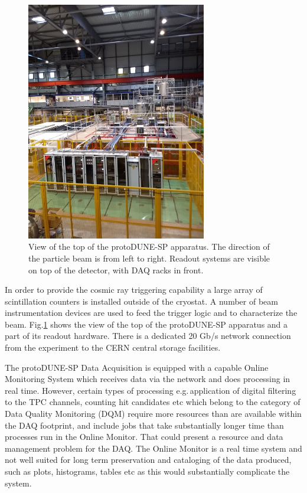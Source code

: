 \documentclass{webofc}
\newcommand{\pd}{protoDUNE\xspace}
\begin{document}
\begin{figure}[tb]
\centering\includegraphics[width=0.7\textwidth]{figures/np04_photo_2018_v1.png}
\caption{\label{fig:np04_photo}
View of the top of the \pd-SP apparatus.
The direction of the particle beam is from left to right.
Readout systems are visible on top of the detector, with DAQ racks in front.
}
\end{figure}


In order to provide the cosmic ray triggering capability a large array of scintillation
counters is installed outside of the cryostat. A number of beam instrumentation devices
are used to feed the  trigger logic and to characterize the beam. Fig.\ref{fig:np04_photo}
shows the view of the top of the \pd-SP apparatus and a part of its readout hardware.
There is a dedicated 20 Gb/s network connection from the experiment to the CERN central storage facilities.

The \pd-SP Data Acquisition is equipped with a capable Online Monitoring System which receives data via
the network and does processing in real time. However, certain types of processing e.g.\,application of
digital filtering to the TPC channels, counting hit candidates etc which belong to the
category of Data Quality Monitoring (DQM) require more resources than are available within
the DAQ footprint, and include jobs that take substantially longer time than processes run in the
Online Monitor. That could present a resource and data management problem for the DAQ.
The Online Monitor is a real time system
and not well suited for long term preservation and cataloging of the data produced, such as plots,
histograms, tables etc as this would substantially complicate the system.
\end{document}
